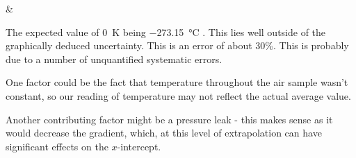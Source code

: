 \documentclass[a4paper,11pt]{article}
\begin{document}
\begin{minipage}[c]{0.2\textwidth}
{\csvcoli&\csvcolii}
\end{minipage}
\begin{minipage}[c]{0.4\textwidth}
\end{minipage}

The expected value of \SI{0}{\kelvin} being \SI{-273.15}{\degreeCelsius} \cite{SI}.
This lies well outside of the graphically deduced uncertainty. This is an error
of about 30\%. This is probably due to a number of unquantified systematic
errors.

One factor could be the fact that temperature throughout the air sample wasn't
constant, so our reading of temperature may not reflect the actual average
value.

Another contributing factor might be a pressure leak - this makes sense as it
would decrease the gradient, which, at this level of extrapolation can have
significant effects on the $x$-intercept.



\end{document}

